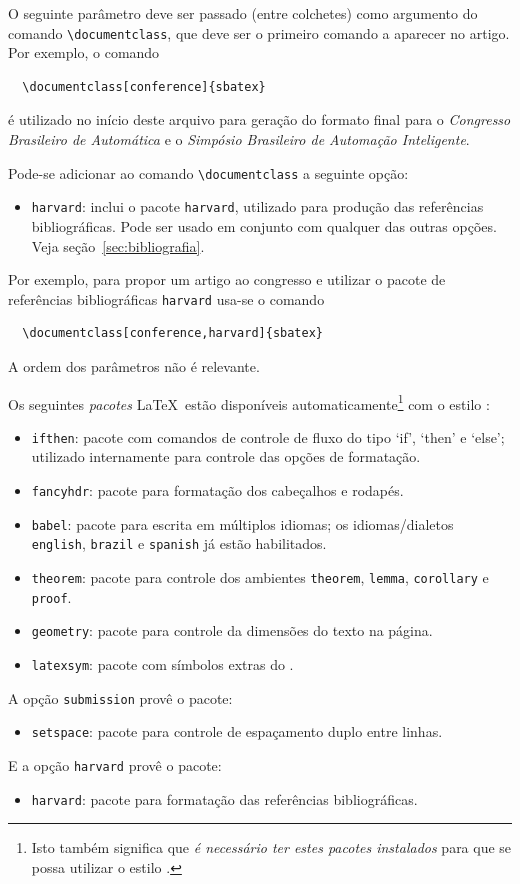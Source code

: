 \documentclass[conference,harvard,brazil,english]{sbatex}
\begin{document}
O seguinte parâmetro deve ser passado (entre colchetes) como argumento do comando
\verb+\documentclass+, que deve ser o primeiro comando a aparecer no
artigo. Por exemplo, o comando
\begin{verbatim}
  \documentclass[conference]{sbatex}
\end{verbatim}
é utilizado no início deste arquivo para geração do formato final
para o \emph{Congresso Brasileiro de Automática} e o
\emph{Simpósio Brasileiro de Automação Inteligente}.

Pode-se adicionar ao comando \verb+\documentclass+ a seguinte
opção:
\begin{itemize}
  \item \verb+harvard+: inclui o pacote \verb+harvard+, utilizado para
  produção das referências bibliográficas. Pode ser usado em conjunto
  com qualquer das outras opções. Veja seção~\ref{sec:bibliografia}.
\end{itemize}
Por exemplo, para propor um artigo ao congresso e utilizar o pacote de
referências bibliográficas \verb+harvard+ usa-se o comando
\begin{verbatim}
  \documentclass[conference,harvard]{sbatex}
\end{verbatim}
A ordem dos parâmetros não é relevante.

Os seguintes \emph{pacotes} \LaTeX\ estão disponíveis
automaticamente\footnote{Isto também significa que \emph{é necessário
ter estes pacotes instalados} para que se possa utilizar o estilo
\SBATeX.} com o estilo \SBATeX:
\begin{itemize}
\item \verb+ifthen+: pacote com comandos de controle de fluxo do tipo
`if', `then' e `else'; utilizado internamente para controle das opções de
formatação.
\item \verb+fancyhdr+: pacote para formatação dos cabeçalhos e rodapés.
\item \verb+babel+: pacote para escrita em múltiplos idiomas; os
idiomas/dialetos \verb+english+, \verb+brazil+ e \verb+spanish+ já
estão habilitados.
\item \verb+theorem+: pacote para controle dos ambientes \verb+theorem+,
\verb+lemma+, \verb+corollary+ e \verb+proof+.
\item \verb+geometry+: pacote para controle da dimensões do texto na página.
\item \verb+latexsym+: pacote com símbolos extras do \LaTeXe.
\end{itemize}

A opção \verb+submission+ provê o pacote:
\begin{itemize}
\item \verb+setspace+: pacote para controle de espaçamento duplo entre
linhas.
\end{itemize}
E a opção \verb+harvard+ provê o pacote:
\begin{itemize}
\item \verb+harvard+: pacote para formatação das referências
bibliográficas.
\end{itemize}
\end{document}
